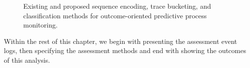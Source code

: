 \begin{figure}[htb]
	\begin{center}
		\caption[Predictive process monitoring methods]{Existing and proposed sequence encoding, trace bucketing, and classification methods for outcome-oriented predictive process monitoring.}
		\label{fig:all2}
	\end{center}
\end{figure}


Within the rest of this chapter, we begin with presenting the assessment event logs, then specifying the assessment methods and end with showing the outcomes of this analysis.


\ifpdf
    \graphicspath{{X/figures/PNG/}{X/figures/PDF/}{X/figures/}}
\else
    \graphicspath{{X/figures/EPS/}{X/figures/}}
\fi


%	
%

